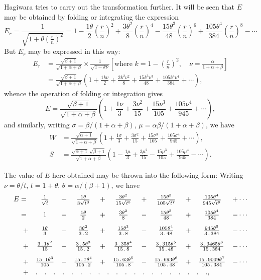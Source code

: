 \documentclass[11pt]{article}
\begin{document}
Hagiwara tries to carry out the transformation further. It will be seen that $E$ may be obtained by folding or integratiug the expression
\[
E_r = \frac{1}{\sqrt{1+\theta\left(\frac{r}{n}\right)^2}} = 1 - \frac{1\theta}{2}\left(\frac{r}{n}\right)^2 + \frac{3\theta^2}{8}\left(\frac{r}{n}\right)^4 - \frac{15\theta^3}{48}\left(\frac{r}{n}\right)^6 + \frac{105\theta^4}{384}\left(\frac{r}{n}\right)^8 - \cdots
\]
But $E_r$ may be expressed in this way:
\begin{align*}
E_r &= \frac{\sqrt{\beta+1}}{\sqrt{1+\alpha+\beta}} \times \frac{1}{\sqrt{1-k\nu}} \left[\text{where } k = 1 - \left(\frac{r}{n}\right)^2,\quad \nu = \frac{\alpha}{1+\alpha+\beta}\right]\\
&= \frac{\sqrt{\beta+1}}{\sqrt{1+\alpha+\beta}}\left(1 + \frac{1k\nu}{2} + \frac{3k^2\nu^2}{8} + \frac{15k^3\nu^3}{48} + \frac{105k^4\nu^4}{384} + \cdots\right),
\end{align*}
whence the operation of folding or integration gives
\[
E = \frac{\sqrt{\beta+1}}{\sqrt{1+\alpha+\beta}}\left(1 + \frac{1\nu}{3} + \frac{3\nu^2}{15} + \frac{15\nu^3}{105} + \frac{105\nu^4}{945} + \cdots\right),
\]
and similarly, writing $\sigma = \beta/(1+\alpha+\beta)$, $\mu = \alpha\beta/(1+\alpha+\beta)$, we have
\begin{align*}
W &= \frac{\sqrt{\alpha+1}}{\sqrt{1+\alpha+\beta}}\left(1 + \frac{1\sigma}{3} + \frac{3\sigma^2}{15} + \frac{15\sigma^3}{105} + \frac{105\sigma^4}{945} + \cdots\right),\\
S &= \frac{\sqrt{\alpha+1}\,\sqrt{\beta+1}}{\sqrt{1+\alpha+\beta}}\left(1 - \frac{1\mu}{3} + \frac{3\mu^2}{15} - \frac{15\mu^3}{105} + \frac{105\mu^4}{945} - \cdots\right).
\end{align*}

The value of $E$ here obtained may be thrown into the following form: Writing $\nu = \theta/t$, $t = 1+\theta$, $\theta = \alpha/(\beta+1)$, we have
\[
\begin{array}{rcccccccccl}
E ={} & \frac{1}{\sqrt{t}} & + & \frac{1\theta}{3\sqrt{t^3}} & + & \frac{3\theta^2}{15\sqrt{t^5}} & + & \frac{15\theta^3}{105\sqrt{t^7}} & + & \frac{105\theta^4}{945\sqrt{t^9}} & +\cdots\\[3mm]
={} & 1 & - & \frac{1\theta}{2} & + & \frac{3\theta^2}{8} & - & \frac{15\theta^3}{48} & + & \frac{105\theta^4}{384} & -\cdots\\[3mm]
+ & \frac{1\theta}{3} & - & \frac{3\theta^2}{3\,.\,2} & + & \frac{15\theta^3}{3\,.\,8} & - & \frac{105\theta^4}{3\,.\,48} & + & \frac{945\theta^5}{3\,.\,384} & -\cdots\\[3mm]
+ & \frac{3\,.\,1\theta^2}{15} & - & \frac{3\,.\,5\theta^3}{15\,.\,2} & + & \frac{3\,.\,35\theta^4}{15\,.\,8} & - & \frac{3\,.\,315\theta^5}{15\,.\,48} & + & \frac{3\,.\,3465\theta^6}{15\,.\,384} & -\cdots\\[3mm]
+ & \frac{15\;\;1\theta^3}{105} & - & \frac{15\,.\,7\theta^4}{105\,.\,2} & + & \frac{15\,.\,63\theta^5}{105\,.\,8} & - & \frac{15\,.\,693\theta^6}{105\,.\,48} & + & \frac{15\,.\,9009\theta^7}{105\,.\,384} & -\cdots\\[1mm]
+ & \multicolumn{10}{l}{.\quad.\quad.\quad.\quad.\quad.\quad.\quad.\quad.\quad.\quad.\quad.\quad.\quad.\quad.\quad.\quad.\quad.\quad.\quad.,}
\end{array}
\]
\end{document}
